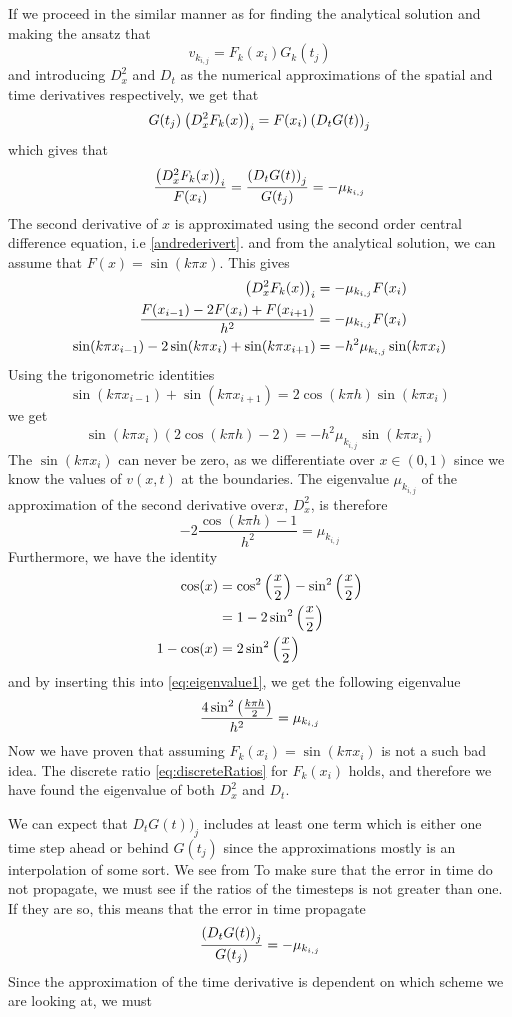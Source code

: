 \documentclass[12pt,english,a4paper]{article}
\begin{document}
If we proceed in the similar manner as for finding the analytical solution and making the ansatz that
\[
v_{k_{i,j}} = F_k(x_i)G_k(t_j)
\]
and introducing \(D_x^2\) and \(D_t\) as the numerical approximations of the spatial and time derivatives respectively, we get that
\[
G(t_j)\:\qty(D_x^2F_k(x))_i = F(x_i)\:\qty(D_tG(t))_j
\]
which gives that
\begin{equation}\label{eq:discreteRatios}
\frac{\qty(D_x^2F_k(x))_i }{ F(x_i)} = \frac{\qty(D_tG(t))_j}{G(t_j)} = -\mu_{k_{i,j}}
\end{equation}
The second derivative of \(x\) is approximated using the second order central difference equation, i.e \vref{andrederivert}.
and from the analytical solution, we can assume that \(F(x) = \sin(k \pi x)\). This gives
\begin{align*}
\qty(D_x^2F_k(x))_i &= -\mu_{k_{i,j}}F(x_i) \\
\frac{F(x_{i-1}) -2F(x_i) + F(x_{i+1}) }{h^2} &= -\mu_{k_{i,j}}F(x_i) \\
\sin(k\pi x_{i-1}) -2\sin(k\pi x_i) + \sin(k \pi x_{i+1}) &= -h^2\mu_{k_{i,j}}\sin(k \pi x_i)
\end{align*}
Using the trigonometric identities
\[
\sin(k\pi x_{i-1}) + \sin(k\pi x_{i+1}) = 2\cos(k\pi h)\sin(k\pi x_i)
\]
we get
\[
\sin(k\pi x_i)(2\cos(k\pi h) - 2) = -h^2\mu_{k_{i,j}}\sin(k \pi x_i)
\]
The \(\sin(k\pi x_i) \) can never be zero, as we differentiate over \(x \in (0,1) \) since we know the values of \( v(x,t) \) at the boundaries. The eigenvalue \(\mu_{k_{i,j}}\) of the approximation of the second derivative over\(x \), \( D_x^2 \), is therefore
\begin{equation}\label{eq:eigenvalue1}
-2\frac{\cos(k\pi h) - 1}{h^2} =\mu_{k_{i,j}}
\end{equation}
Furthermore, we have the identity
\begin{align*}
\cos(x) &= \cos^2\qty(\frac{x}{2}) - \sin^2\qty(\frac{x}{2}) \\
&= 1- 2\sin^2\qty(\frac{x}{2}) \\
1-\cos(x) &= 2\sin^2\qty(\frac{x}{2})
\end{align*}
and by inserting this into \vref{eq:eigenvalue1}, we get the following eigenvalue
\[
\frac{4\sin^2\qty(\frac{k\pi h}{2})}{h^2} =\mu_{k_{i,j}}
\]
Now we have proven that assuming \(F_k(x_i) = \sin(k\pi x_i)\) is not a such bad idea. The discrete ratio \vref{eq:discreteRatios} for \(F_k(x_i)\) holds, and therefore we have found the eigenvalue of both \(D_x^2\) and \(D_t\).

We can expect that \( D_tG(t))_j\) includes at least one term which is either one time step ahead or behind \(G(t_j)\) since the approximations mostly is an interpolation of some sort. We see from To make sure that the error in time do not propagate, we must see if the ratios of the timesteps is not greater than one. If they are so, this means that the error in time propagate
\[
\frac{\qty(D_tG(t))_j}{G(t_j)} = -\mu_{k_{i,j}}
\]
Since the approximation of the time derivative is dependent on which scheme we are looking at, we must
\end{document}
